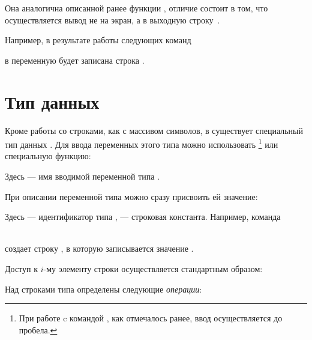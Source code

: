 
Она аналогична описанной ранее функции , отличие состоит в том, что осуществляется вывод не на
экран, а в выходную строку~.

Например, в результате работы следующих команд



в переменную  будет записана строка .

\section[Тип данных string]{Тип данных }\label{ch08:3}
Кроме работы со строками, как с массивом символов, в  существует специальный тип данных .
Для ввода переменных этого типа можно использовать \footnote{При работе c командой
, как отмечалось ранее, ввод осуществляется до пробела.} или специальную функцию:


Здесь  --- имя вводимой переменной типа .

При описании переменной типа  можно сразу присвоить ей значение:


Здесь  --- идентификатор типа ,  --- строковая
константа. Например, команда

\\
создает строку , в которую записывается значение .

Доступ к $i$-му элементу строки осуществляется стандартным образом:


Над строками типа  определены следующие \emph{операции}:

